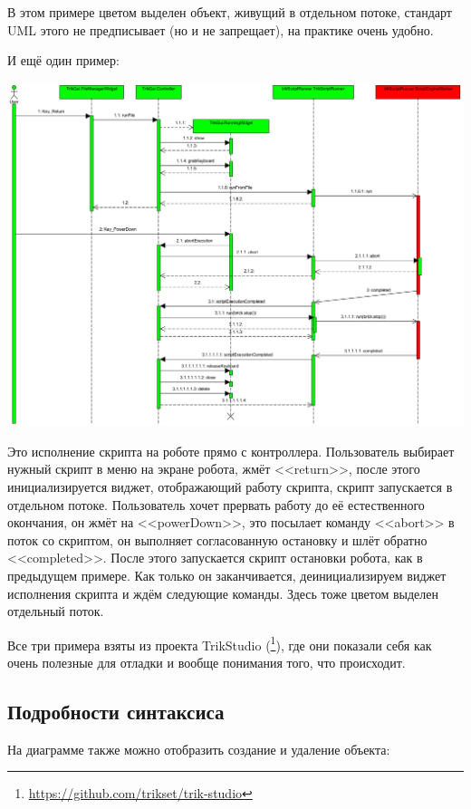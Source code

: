 \documentclass[a5paper]{article}
\begin{document}
В этом примере цветом выделен объект, живущий в отдельном потоке, стандарт UML этого не предписывает (но и не запрещает), на практике очень удобно.

И ещё один пример:

\begin{center}
    \includegraphics[width=\textwidth]{sequenceDiagramExample3.png}
\end{center}

Это исполнение скрипта на роботе прямо с контроллера. Пользователь выбирает нужный скрипт в меню на экране робота, жмёт <<return>>, после этого инициализируется виджет, отображающий работу скрипта, скрипт запускается в отдельном потоке. Пользователь хочет прервать работу до её естественного окончания, он жмёт на <<powerDown>>, это посылает команду <<abort>> в поток со скриптом, он выполняет согласованную остановку и шлёт обратно <<completed>>. После этого запускается скрипт остановки робота, как в предыдущем примере. Как только он заканчивается, деинициализируем виджет исполнения скрипта и ждём следующие команды. Здесь тоже цветом выделен отдельный поток.

Все три примера взяты из проекта TrikStudio (\footnote{\url{https://github.com/trikset/trik-studio}}), где они показали себя как очень полезные для отладки и вообще понимания того, что происходит.

\subsection{Подробности синтаксиса}

На диаграмме также можно отобразить создание и удаление объекта:
\end{document}
